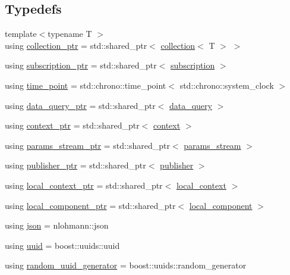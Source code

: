 \subsection*{Typedefs}
\begin{DoxyCompactItemize}
\item 
{\footnotesize template$<$typename T $>$ }\\using \hyperlink{namespacetelegraph_a4fa3678b3fd260dc79a98bea50d582fd}{collection\+\_\+ptr} = std\+::shared\+\_\+ptr$<$ \hyperlink{classtelegraph_1_1collection}{collection}$<$ T $>$ $>$
\item 
using \hyperlink{namespacetelegraph_a58641aa5b1a2cbdb0431916a87069f64}{subscription\+\_\+ptr} = std\+::shared\+\_\+ptr$<$ \hyperlink{classtelegraph_1_1subscription}{subscription} $>$
\item 
using \hyperlink{namespacetelegraph_a0f1714084e0d249aa06f757c9159c0ca}{time\+\_\+point} = std\+::chrono\+::time\+\_\+point$<$ std\+::chrono\+::system\+\_\+clock $>$
\item 
using \hyperlink{namespacetelegraph_a6ffe775ac48dca2a4013b53d692199c8}{data\+\_\+query\+\_\+ptr} = std\+::shared\+\_\+ptr$<$ \hyperlink{classtelegraph_1_1data__query}{data\+\_\+query} $>$
\item 
using \hyperlink{namespacetelegraph_a332e681f0d44a1308cf3a013a9dd140f}{context\+\_\+ptr} = std\+::shared\+\_\+ptr$<$ \hyperlink{classtelegraph_1_1context}{context} $>$
\item 
using \hyperlink{namespacetelegraph_ad071241508ea0f86c7de0686016f9ca9}{params\+\_\+stream\+\_\+ptr} = std\+::shared\+\_\+ptr$<$ \hyperlink{classtelegraph_1_1params__stream}{params\+\_\+stream} $>$
\item 
using \hyperlink{namespacetelegraph_aff5109352406dd9a8cd38f431f808bc5}{publisher\+\_\+ptr} = std\+::shared\+\_\+ptr$<$ \hyperlink{classtelegraph_1_1publisher}{publisher} $>$
\item 
using \hyperlink{namespacetelegraph_ab59c7b38d99a98b4acc22433c920b1e6}{local\+\_\+context\+\_\+ptr} = std\+::shared\+\_\+ptr$<$ \hyperlink{classtelegraph_1_1local__context}{local\+\_\+context} $>$
\item 
using \hyperlink{namespacetelegraph_a69cfb42be07c9189123cfa3ff3ec4487}{local\+\_\+component\+\_\+ptr} = std\+::shared\+\_\+ptr$<$ \hyperlink{classtelegraph_1_1local__component}{local\+\_\+component} $>$
\item 
using \hyperlink{namespacetelegraph_ab87b47a6b955c365ddd74c343ecc16f4}{json} = nlohmann\+::json
\item 
using \hyperlink{namespacetelegraph_a51ee91d7eaeef067f7ccac2b170e5d59}{uuid} = boost\+::uuids\+::uuid
\item 
using \hyperlink{namespacetelegraph_a201160a557b56b424ce605263acdb0ae}{random\+\_\+uuid\+\_\+generator} = boost\+::uuids\+::random\+\_\+generator
\end{DoxyCompactItemize}
